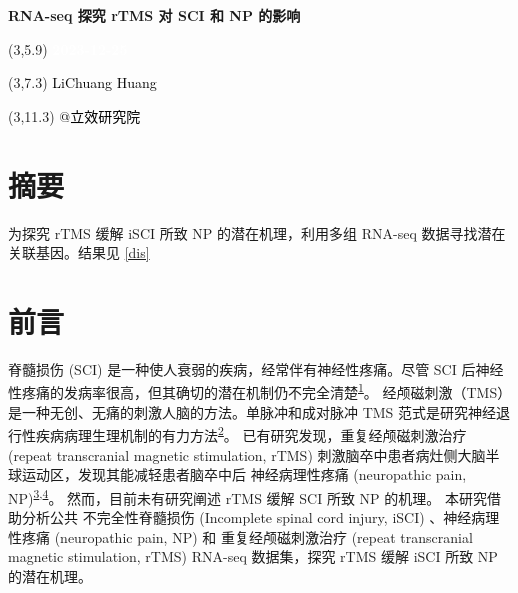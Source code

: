 \documentclass[
]{article}
\author{}
\date{\vspace{-2.5em}}
\begin{document}
\begin{titlepage} 
\begin{center} \textbf{\Huge RNA-seq 探究 rTMS 对
SCI 和 NP 的影响} \vspace{4em}
\begin{textblock}{10}(3,5.9) \huge
\textbf{\textcolor{white}{2023-12-25}}
\end{textblock} \begin{textblock}{10}(3,7.3)
\Large \textcolor{black}{LiChuang Huang}
\end{textblock} \begin{textblock}{10}(3,11.3)
\Large \textcolor{black}{@立效研究院}
\end{textblock} \end{center} \end{titlepage}
\restoregeometry


\tableofcontents

\listoffigures

\listoftables

\newpage


\hypertarget{abstract}{%
\section{摘要}\label{abstract}}

为探究 rTMS 缓解 iSCI 所致 NP 的潜在机理，利用多组 RNA-seq 数据寻找潜在关联基因。结果见 \ref{dis}

\hypertarget{introduction}{%
\section{前言}\label{introduction}}

脊髓损伤 (SCI) 是一种使人衰弱的疾病，经常伴有神经性疼痛。尽管 SCI 后神经性疼痛的发病率很高，但其确切的潜在机制仍不完全清楚\textsuperscript{\protect\hyperlink{ref-TheDualRoleOSunC2023}{1}}。
经颅磁刺激（TMS）是一种无创、无痛的刺激人脑的方法。单脉冲和成对脉冲 TMS 范式是研究神经退行性疾病病理生理机制的有力方法\textsuperscript{\protect\hyperlink{ref-TranscranialMaNiZh2015}{2}}。
已有研究发现，重复经颅磁刺激治疗 (repeat transcranial magnetic stimulation, rTMS) 刺激脑卒中患者病灶侧大脑半球运动区，发现其能减轻患者脑卒中后 神经病理性疼痛 (neuropathic pain, NP)\textsuperscript{\protect\hyperlink{ref-DifferentialEfAmeli2009}{3},\protect\hyperlink{ref-ReductionOfInHiraya2006}{4}}。
然而，目前未有研究阐述 rTMS 缓解 SCI 所致 NP 的机理。
本研究借助分析公共 不完全性脊髓损伤 (Incomplete spinal cord injury, iSCI) 、神经病理性疼痛 (neuropathic pain, NP) 和 重复经颅磁刺激治疗 (repeat transcranial magnetic stimulation, rTMS) RNA-seq 数据集，探究 rTMS 缓解 iSCI 所致 NP 的潜在机理。
\end{document}

